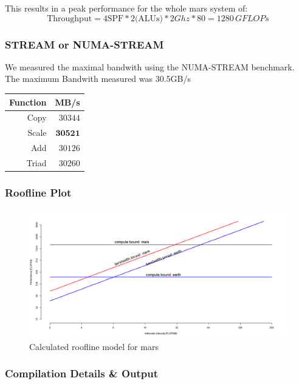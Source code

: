 This results in a peak performance for the whole mars system of:
$$\text{Throughput} = 4 \text{SPF} * 2 \text{(ALUs)} * 2 Ghz * 80 = 1280 \, GFLOPs$$

\subsubsection{STREAM or NUMA-STREAM}

We measured the maximal bandwith using the NUMA-STREAM benchmark.
The maximum Bandwith measured was 30.5GB/s

\begin{center}
\begin{tabular}{|r|r|}
	\hline
	Function & MB/s    \\ \hline
	Copy     & $30344$ \\ \hline
	Scale    & $\pmb{30521}$ \\ \hline
	Add      & $30126$ \\ \hline
	Triad    & $30260$ \\ \hline
\end{tabular}
\end{center}

\subsubsection{Roofline Plot}

\begin{figure}[]
	\centering
	\includegraphics[width=.5\linewidth]{figures/placeholder}
	\caption{Calculated roofline model for mars}
	\label{fig:runtime}
\end{figure}

\newpage
\subsubsection{Compilation Details \& Output}

